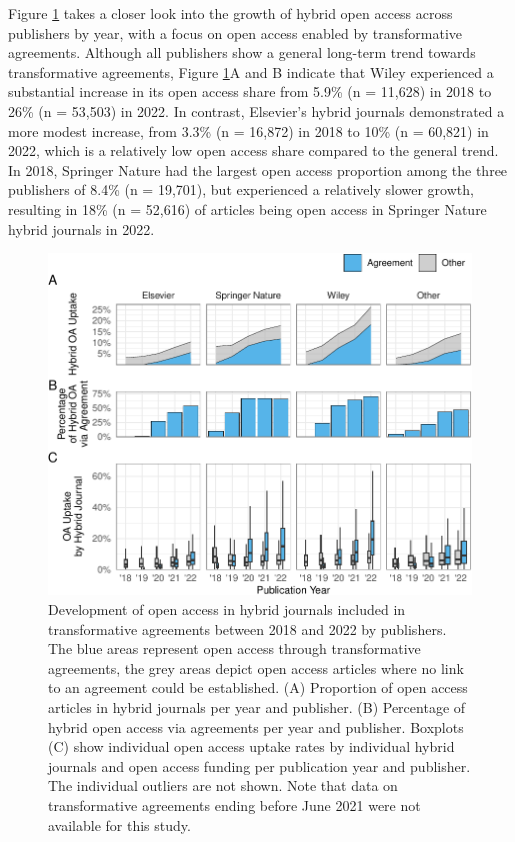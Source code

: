 \documentclass[a4paper,man,floatsintext,longtable,noextraspace,12pt]{apa6}
\begin{document}
Figure \ref{fig:publisher_figure} takes a closer look into the growth of
hybrid open access across publishers by year, with a focus on open
access enabled by transformative agreements. Although all publishers
show a general long-term trend towards transformative agreements, Figure
\ref{fig:publisher_figure}A and B indicate that Wiley experienced a
substantial increase in its open access share from 5.9\% (n = 11,628) in
2018 to 26\% (n = 53,503) in 2022. In contrast, Elsevier's hybrid
journals demonstrated a more modest increase, from 3.3\% (n = 16,872) in
2018 to 10\% (n = 60,821) in 2022, which is a relatively low open access
share compared to the general trend. In 2018, Springer Nature had the
largest open access proportion among the three publishers of 8.4\% (n =
19,701), but experienced a relatively slower growth, resulting in 18\%
(n = 52,616) of articles being open access in Springer Nature hybrid
journals in 2022.

\begin{figure}[ht!]

{\centering \includegraphics[width=0.99\linewidth,]{fig/publisher_figure-1} 

}

\caption{Development of open access in hybrid journals included in transformative agreements between 2018 and 2022 by publishers. The blue areas represent open access through transformative agreements, the grey areas depict open access articles where no link to an agreement could be established. (A) Proportion of open access articles in hybrid journals per year and publisher. (B) Percentage of hybrid open access via agreements per year and publisher. Boxplots (C) show individual open access uptake rates by individual hybrid journals and open access funding per publication year and publisher. The individual outliers are not shown. Note that data on transformative agreements ending before June 2021 were not available for this study.}\label{fig:publisher_figure}
\end{figure}
\end{document}
